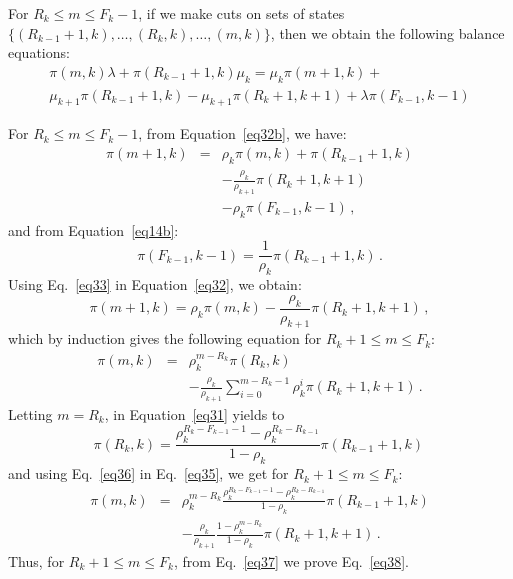 \documentclass[conference]{IEEEtran}
\begin{document}
\begin{IEEEproof}
For $R_k \leq m \leq F_k-1$, if we make cuts on sets of states 
$\{(R_{k-1}+1,k),\ldots,(R_{k},k),\ldots, (m,k)\}$,  
then we obtain the following balance equations:
\begin{multline}
 \pi(m,k)\lambda +   \pi(R_{k-1}+1,k) \mu_k = \mu_k \pi(m+1,k) + \\
 \mu_{k+1} \pi(R_{k-1}+1,k) - \mu_{k+1} \pi(R_{k}+1, k+1) +  \lambda \pi(F_{k-1}, k-1)
\label{eq32b}
\end{multline}

For $R_{k} \leq m \leq F_k-1$, from Equation~\eqref{eq32b}, we have:
\begin{eqnarray}
\pi(m+1,k)  &=& \rho_k \pi(m,k) +  \pi(R_{k-1}+1,k) \nonumber\\
&&- \frac{\rho_k}{\rho_{k+1}} \pi(R_{k}+1, k+1) \nonumber \\
&&- \rho_k \pi(F_{k-1}, k-1) \, ,
\label{eq32}
\end{eqnarray} 
and from Equation~\eqref{eq14b}:
\begin{equation}
\pi(F_{k-1},k-1)= \frac{1}{\rho_k} \pi(R_{k-1}+1,k) \, .
\label{eq33}
\end{equation} 
Using Eq.~\eqref{eq33} in Equation~\eqref{eq32}, we obtain:
\begin{equation}
\pi(m+1,k)  = \rho_k \pi(m,k)    - \frac{\rho_k}{\rho_{k+1}} \pi(R_{k}+1, k+1) \, ,
\label{eq34}
\end{equation} 
which by induction gives the following equation for $R_k+1 \leq m \leq F_k$:
\begin{eqnarray}
\pi(m,k)  &=& \rho_k^{m-R_k} \pi(R_k,k)  \nonumber  \\
&&- \frac{\rho_k}{\rho_{k+1}} \sum_{i=0}^{m-R_k-1} \rho_k^i \pi(R_{k}+1, k+1) \, .
\label{eq35}
\end{eqnarray} 
Letting $m=R_k$, in Equation~\eqref{eq31} yields to
\begin{equation}
\pi(R_k,k)= \frac{ \rho_k^{R_k-F_{k-1}-1}-\rho_k^{R_k-R_{k-1}} } {1-\rho_k} \pi(R_{k-1}+1,k) \, 
\label{eq36}
\end{equation} 
and using Eq.~\eqref{eq36} in Eq.~\eqref{eq35}, we get for $R_k+\!1 \! \leq m \leq \! F_k$:
\begin{eqnarray}
\pi(m,k)\! & \! = \! & \rho_k^{m-R_k} \frac{ \rho_k^{R_k-F_{k-1}-1}-\rho_k^{R_k-R_{k-1}} } {1-\rho_k} \pi(R_{k-1} \! +\!1,k) \nonumber\\
&&- \frac{\rho_k}{\rho_{k+1}} \frac{1- \rho_k ^{m-R_k}} {1-\rho_k} \pi(R_{k}+1, k+1) \, .
 \label{eq37}
\end{eqnarray}
Thus, for $R_k+1 \! \leq \! m \! \leq \! F_k$, from Eq.~\eqref{eq37} we prove Eq.~\eqref{eq38}. 
\end{IEEEproof}
\end{document}
